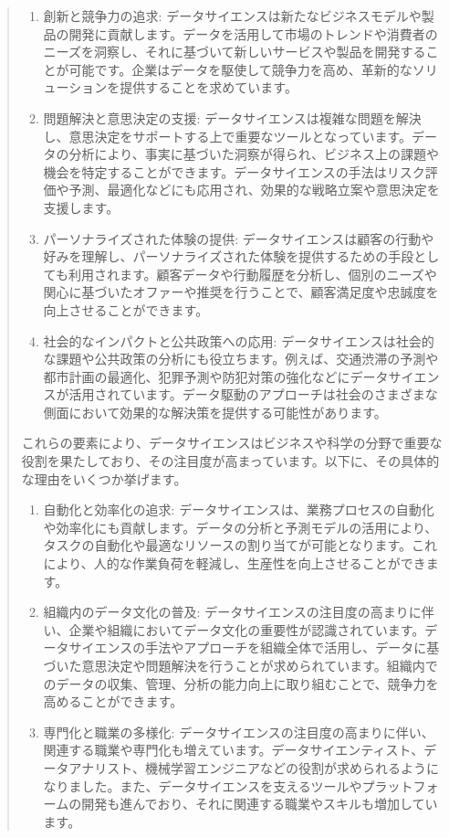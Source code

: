 \documentclass[
  xelatex, ja=standard]{bxjsbook}
\theoremstyle{definition}
\theoremstyle{definition}
\theoremstyle{definition}
\theoremstyle{definition}
\theoremstyle{remark}
\begin{document}
\begin{quote}
\begin{enumerate}
\def\labelenumi{\arabic{enumi}.}
\setcounter{enumi}{4}
\item
  創新と競争力の追求: データサイエンスは新たなビジネスモデルや製品の開発に貢献します。データを活用して市場のトレンドや消費者のニーズを洞察し、それに基づいて新しいサービスや製品を開発することが可能です。企業はデータを駆使して競争力を高め、革新的なソリューションを提供することを求めています。
\item
  問題解決と意思決定の支援: データサイエンスは複雑な問題を解決し、意思決定をサポートする上で重要なツールとなっています。データの分析により、事実に基づいた洞察が得られ、ビジネス上の課題や機会を特定することができます。データサイエンスの手法はリスク評価や予測、最適化などにも応用され、効果的な戦略立案や意思決定を支援します。
\item
  パーソナライズされた体験の提供: データサイエンスは顧客の行動や好みを理解し、パーソナライズされた体験を提供するための手段としても利用されます。顧客データや行動履歴を分析し、個別のニーズや関心に基づいたオファーや推奨を行うことで、顧客満足度や忠誠度を向上させることができます。
\item
  社会的なインパクトと公共政策への応用: データサイエンスは社会的な課題や公共政策の分析にも役立ちます。例えば、交通渋滞の予測や都市計画の最適化、犯罪予測や防犯対策の強化などにデータサイエンスが活用されています。データ駆動のアプローチは社会のさまざまな側面において効果的な解決策を提供する可能性があります。
\end{enumerate}

これらの要素により、データサイエンスはビジネスや科学の分野で重要な役割を果たしており、その注目度が高まっています。以下に、その具体的な理由をいくつか挙げます。

\begin{enumerate}
\def\labelenumi{\arabic{enumi}.}
\item
  自動化と効率化の追求: データサイエンスは、業務プロセスの自動化や効率化にも貢献します。データの分析と予測モデルの活用により、タスクの自動化や最適なリソースの割り当てが可能となります。これにより、人的な作業負荷を軽減し、生産性を向上させることができます。
\item
  組織内のデータ文化の普及: データサイエンスの注目度の高まりに伴い、企業や組織においてデータ文化の重要性が認識されています。データサイエンスの手法やアプローチを組織全体で活用し、データに基づいた意思決定や問題解決を行うことが求められています。組織内でのデータの収集、管理、分析の能力向上に取り組むことで、競争力を高めることができます。
\item
  専門化と職業の多様化: データサイエンスの注目度の高まりに伴い、関連する職業や専門化も増えています。データサイエンティスト、データアナリスト、機械学習エンジニアなどの役割が求められるようになりました。また、データサイエンスを支えるツールやプラットフォームの開発も進んでおり、それに関連する職業やスキルも増加しています。
\end{enumerate}


\end{quote}
\end{document}
